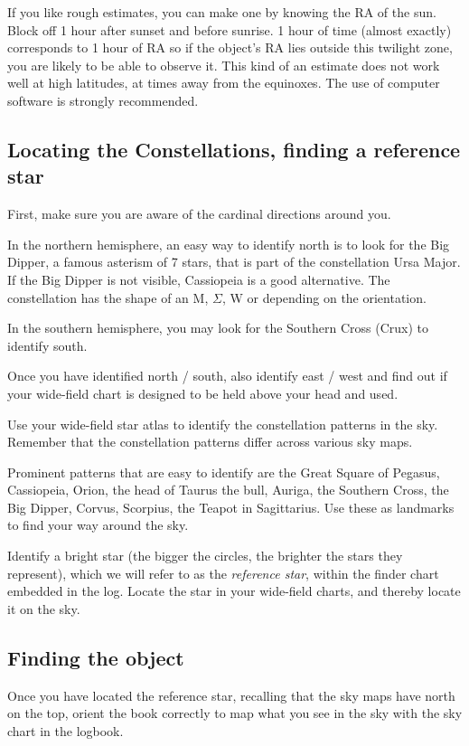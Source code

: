 If you like rough estimates, you can make one by knowing the RA of the
sun. Block off 1 hour after sunset and before sunrise. 1 hour of time
(almost exactly) corresponds to 1 hour of RA so if the object's RA
lies outside this twilight zone, you are likely to be able to observe
it. This kind of an estimate does not work well at high latitudes, at
times away from the equinoxes. The use of computer software is
strongly recommended.

\subsection{Locating the Constellations, finding a reference star}
First, make sure you are aware of the cardinal directions around
you. 

In the northern hemisphere, an easy way to identify north is to look
for the Big Dipper, a famous asterism of 7 stars, that is part of the
constellation Ursa Major. If the Big Dipper is not visible, Cassiopeia
is a good alternative. The constellation has the shape of an M,
$\Sigma$, W or  depending on the orientation.

In the southern hemisphere, you may look for the Southern Cross (Crux)
to identify south.

Once you have identified north / south, also identify east / west and
find out if your wide-field chart is designed to be held above your
head and used.

Use your wide-field star atlas to identify the constellation patterns
in the sky. Remember that the constellation patterns differ across
various sky maps.

Prominent patterns that are easy to identify are the Great Square of
Pegasus, Cassiopeia, Orion, the head of Taurus the bull, Auriga, the
Southern Cross, the Big Dipper, Corvus, Scorpius, the Teapot in
Sagittarius. Use these as landmarks to find your way around the sky.

Identify a bright star (the bigger the circles, the brighter the stars
they represent), which we will refer to as the \emph{reference star},
within the finder chart embedded in the log. Locate the star in your
wide-field charts, and thereby locate it on the sky.

\subsection{Finding the object}

Once you have located the reference star, recalling that the sky maps
have north on the top, orient the book correctly to map what you see
in the sky with the sky chart in the logbook.

